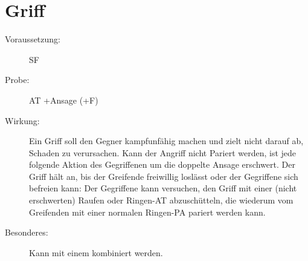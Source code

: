 \section{Griff}
\label{uAT.griff}
\begin{description}
    \item[Voraussetzung:]
        SF 
    \item[Probe:]
        AT +Ansage (+F)
    \item[Wirkung:]
        Ein Griff soll den Gegner kampfunfähig machen und zielt nicht darauf ab, Schaden zu verursachen.
        Kann der Angriff nicht Pariert werden, ist jede folgende Aktion des Gegriffenen um die doppelte Ansage erschwert.
        Der Griff hält an, bis der Greifende freiwillig loslässt oder der Gegriffene sich befreien kann:
        Der Gegriffene kann versuchen, den Griff mit einer (nicht erschwerten) Raufen oder Ringen-AT abzuschütteln, die wiederum vom Greifenden mit einer normalen Ringen-PA pariert werden kann.
    \item[Besonderes:]
        Kann mit einem  kombiniert werden.
\end{description}
